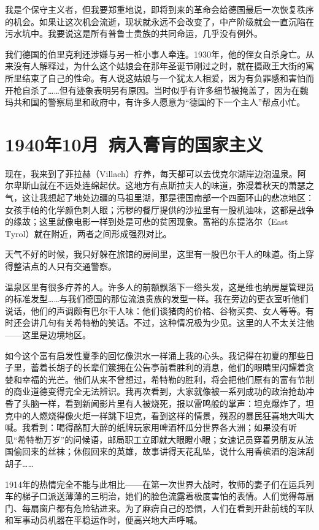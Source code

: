 \documentclass[UTF8]{ctexart}
\begin{document}
我是个保守主义者，但我要郑重地说，即将到来的革命会给德国最后一次恢复秩序的机会。如果让这次机会流逝，现状就永远不会改变了，中产阶级就会一直沉陷在污水坑中。我要说这是所有普鲁士贵族的共同命运，几乎没有例外。

我们德国的伯里克利还涉嫌与另一桩小事人牵连。1930年，他的侄女自杀身亡。从来没有人解释过，为什么这个姑娘会在那年圣诞节刚过之时，就在摄政王大街的寓所里结束了自己的性命。有人说这姑娘与一个犹太人相爱，因为有负罪感和害怕而开枪自杀了……但有迹象表明另有原因。当时似乎有许多细节被掩盖了，因为在魏玛共和国的警察局里和政府中，有许多人愿意为“德国的下一个主人”帮点小忙。

\section{1940年10月\ 病入膏肓的国家主义}

现在，我来到了菲拉赫（Villach）疗养，每天都可以去伐克尔湖岸边泡温泉。阿尔卑斯山就在不远处连绵起伏。这地方有点斯拉夫人的味道，弥漫着秋天的萧瑟之气，这让我想起了地处边疆的马祖里湖，那是德国南部一个四面环山的悲凉地区：女孩手帕的化学颜色刺人眼；污秽的餐厅提供的沙拉里有一股机油味，这都是战争的缘故；这里就像电影一样到处是可悲的贫困现象。富裕的东提洛尔（East Tyrol）就在附近，两者之间形成强烈对比。

天气不好的时候，我只好躲在旅馆的房间里，这里有一股巴尔干人的味道。街上穿得整洁点的人只有交通警察。

温泉区里有很多疗养的人。许多人的前额飘落下一绺头发，这是维也纳房屋管理员的标准发型……与我们德国的那位流浪贵族的发型一样。我在旁边的更衣室听他们说话，他们的声调颇有巴尔干人味：他们谈猪肉的价格、谷物买卖、女人等等。有时还会讲几句有关希特勒的笑话。不过，这种情况极为少见。这里的人不太关注他——这里是边境地区。

如今这个富有启发性夏季的回忆像洪水一样涌上我的心头。我记得在初夏的那些日子里，蓄着长胡子的长辈们簇拥在公告亭前看胜利的消息，他们的眼睛里闪耀着贪婪和幸福的光芒。他们从来不曾想过，希特勒的胜利，将会把他们原有的富有节制的商业道德变得完全无法辨识。我再次看到，大家就像被一系列成功的政治抢劫冲昏了头脑一样，看到新闻影片里有人被烧死，报以雷鸣般的掌声：坦克爆炸了，坦克中的人燃烧得像火炬一样跳下坦克，看到这样的情景，残忍的暴民狂喜地大叫大喊。我看到：喝得酩酊大醉的纸牌玩家用啤酒杯瓜分世界各大洲；如果没有听见“希特勒万岁”的问候语，邮局职工立即就大眼瞪小眼；女速记员穿着男朋友从法国偷回来的丝袜；休假回来的英雄，故事讲得天花乱坠，说什么用香槟酒的泡沫刮胡子……

1914年的热情完全不能与此相比——在第一次世界大战时，牧师的妻子们在运兵列车的梯子口派送薄薄的三明治，她们的脸色流露着极度害怕的表情。人们觉得每扇门、每扇窗户都有危险钻进来。为了麻痹自己的恐惧，人们在看到开赴前线的军队和军事动员机器在平稳运作时，便高兴地大声呼喊。
\end{document}
